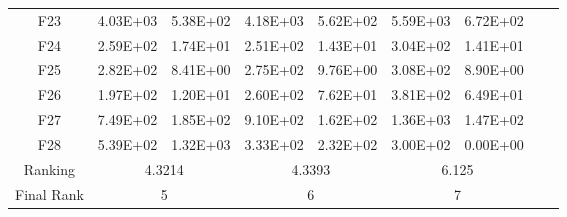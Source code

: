 \begin{table*}[htbp]
\begin{tabular}{|c|cc|cc|cc|cc|}
    F23   & 4.03E+03 & 5.38E+02 & 4.18E+03 & 5.62E+02 & 5.59E+03 & 6.72E+02 \\
    F24   & 2.59E+02 & 1.74E+01 & 2.51E+02 & 1.43E+01 & 3.04E+02 & 1.41E+01 \\
    F25   & 2.82E+02 & 8.41E+00 & 2.75E+02 & 9.76E+00 & 3.08E+02 & 8.90E+00 \\
    F26   & 1.97E+02 & 1.20E+01 & 2.60E+02 & 7.62E+01 & 3.81E+02 & 6.49E+01 \\
    F27   & 7.49E+02 & 1.85E+02 & 9.10E+02 & 1.62E+02 & 1.36E+03 & 1.47E+02 \\
    F28   & 5.39E+02 & 1.32E+03 & 3.33E+02 & 2.32E+02 & 3.00E+02 & 0.00E+00 \\
    \cline{1-7}
    Ranking & \multicolumn{2}{c|}{4.3214} & \multicolumn{2}{c|}{4.3393} & \multicolumn{2}{c|}{6.125} \\
    \cline{1-7}
    Final Rank & \multicolumn{2}{c|}{5} & \multicolumn{2}{c|}{6} & \multicolumn{2}{c|}{7} \\
    \cline{1-7}
    \end{tabular}%
  \label{tab:AG_CEC13_EAs30D}%
\end{table*}%

